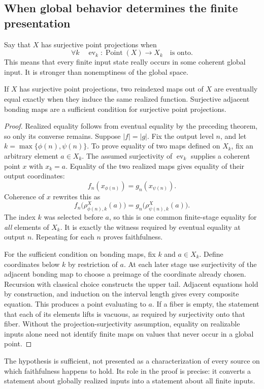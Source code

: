 \subsection{When global behavior determines the finite presentation}
Say that \(X\) has surjective point projections when
\[
 \forall k\quad \operatorname{ev}_k:\operatorname{Point}(X)\to X_k
 \quad\text{is onto}.
\]
This means that every finite input state really occurs in some coherent global input. It is stronger than nonemptiness of the global space.

\begin{KStheorem}\label{KS:KS62}
If \(X\) has surjective point projections, two reindexed maps out of \(X\) are eventually equal exactly when they induce the same realized function. Surjective adjacent bonding maps are a sufficient condition for surjective point projections.
\end{KStheorem}
\begin{proof}
Realized equality follows from eventual equality by the preceding theorem, so only its converse remains. Suppose \(|f|=|g|\). Fix the output level \(n\), and let \(k=\max\{\phi(n),\psi(n)\}\). To prove equality of two maps defined on \(X_k\), fix an arbitrary element \(a\in X_k\). The assumed surjectivity of \(\operatorname{ev}_k\) supplies a coherent point \(x\) with \(x_k=a\). Equality of the two realized maps gives equality of their output coordinates:
\[
 f_n(x_{\phi(n)})=g_n(x_{\psi(n)}).
\]
Coherence of \(x\) rewrites this as
\[
 f_n\bigl(\rho^X_{\phi(n),k}(a)\bigr)
 =g_n\bigl(\rho^X_{\psi(n),k}(a)\bigr).
\]
The index \(k\) was selected before \(a\), so this is one common finite-stage equality for \emph{all} elements of \(X_k\). It is exactly the witness required by eventual equality at output \(n\). Repeating for each \(n\) proves faithfulness.

For the sufficient condition on bonding maps, fix \(k\) and \(a\in X_k\). Define coordinates below \(k\) by restriction of \(a\). At each later stage use surjectivity of the adjacent bonding map to choose a preimage of the coordinate already chosen. Recursion with classical choice constructs the upper tail. Adjacent equations hold by construction, and induction on the interval length gives every composite equation. This produces a point evaluating to \(a\). If a fiber is empty, the statement that each of its elements lifts is vacuous, as required by surjectivity onto that fiber. Without the projection-surjectivity assumption, equality on realizable inputs alone need not identify finite maps on values that never occur in a global point.
\end{proof}
The hypothesis is sufficient, not presented as a characterization of every source on which faithfulness happens to hold. Its role in the proof is precise: it converts a statement about globally realized inputs into a statement about all finite inputs.

